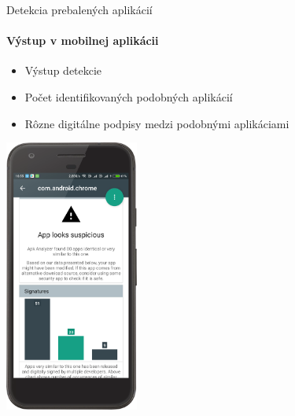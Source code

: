 \documentclass{beamer}
\begin{document}
   \begin{frame}[label=lists]{Detekcia prebalených aplikácií}
 	 \framesubtitle{Výstup v mobilnej aplikácii}
	\begin{minipage}[htb]{\textwidth}
		\begin{minipage}[t]{0.5\textwidth}
			\hbox{}
			\hbox{}
			\hbox{}
			\begin{itemize}
				\item Výstup detekcie
				\item Počet identifikovaných podobných aplikácií
				\item Rôzne digitálne podpisy medzi podobnými aplikáciami
			\end{itemize}
     		\vfill
		\end{minipage}%
	\hfill
	\centering
		\begin{minipage}[t][][b]{0.4\textwidth}
		\centering
		\includegraphics[height=9cm]{images/app/detection_device_1.png}
		\label{fig:app-detail}
		\end{minipage}%
	\end{minipage}
  \end{frame} 
  
\end{document}
